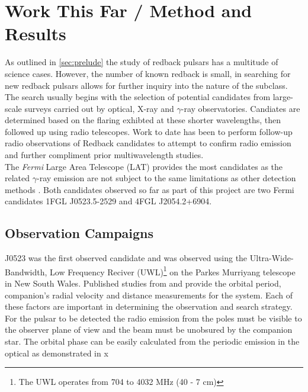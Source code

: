 \section{Work This Far / Method and Results}

As outlined in \cref{sec:prelude} the study of redback pulsars has a multitude of science cases. However, the number of known redback is small, in searching for new redback pulsars allows for further inquiry into the nature of the subclass. The search usually begins with the selection of potential candidates from large-scale surveys carried out by optical, X-ray and $\gamma$-ray observatories. Candiates are determined based on the flaring exhibted at these shorter wavelengths, then followed up using radio telescopes. Work to date has been to perform follow-up radio observations of Redback candidates to attempt to confirm radio emission and further compliment prior multiwavelength studies. \\ 

The \textit{Fermi} Large Area Telescope (LAT) provides the most candidates as the related $\gamma$-ray emission are not subject to the same limitations as other detection methods \citep{ray_radio_2012}. Both candidates observed so far as part of this project are two Fermi candidates 1FGL J0523.5-2529 and 4FGL J2054.2+6904. 

\subsection{Observation Campaigns}

J0523 was the first observed candidate and was observed using the Ultra-Wide-Bandwidth, Low Frequency Reciver (UWL)\footnote{The UWL operates from 704 to 4032 MHz (40 - 7 cm)} on the Parkes Murriyang telescope in New South Wales. Published studies from \cite{strader_1fgl_2014} and \cite{halpern_luminous_2022} provide the orbital period, companion's radial velocity and distance measurements for the system. Each of these factors are important in determining the observation and search strategy. \\ 

For the pulsar to be detected the radio emission from the poles must be visible to the observer plane of view and the beam must be unobsured by the companion star. The orbital phase can be easily calculated from the periodic emission in the optical as demonstrated in x 

